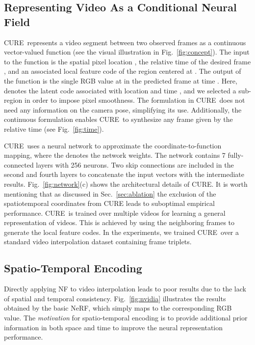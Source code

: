 \documentclass[12pt]{article}
\def\proposed{CURE}
\begin{document}
\subsection{Representing Video As a Conditional Neural Field}

\proposed~represents a video segment between two observed frames as a continuous vector-valued function (see the visual illustration in Fig.~\ref{fig:concept}). The input to the function is the spatial pixel location , the relative time of the desired frame , and an associated local feature code  of the  region centered at . The output of the function is the single RGB value  at  in the predicted frame at time . 
Here,  denotes the latent code associated with location  and time , and we selected a  sub-region in order to impose pixel smoothness.
The formulation in \proposed~does not need any information on the camera pose, simplifying its use.  Additionally, the continuous formulation enables \proposed~to synthesize any frame given by the relative time  (see Fig.~\ref{fig:time}).

\proposed~uses a neural network  to approximate the coordinate-to-function mapping, where the  denotes the network weights. The network contains 7 fully-connected layers with 256 neurons. Two skip connections are included in the second and fourth layers to concatenate the input vectors with the intermediate results. Fig.~\ref{fig:network}(c) shows the architectural details of CURE.
It is worth mentioning that as discussed in Sec.~\ref{sec:ablation} the exclusion of the spatiotemporal coordinates from CURE leads to suboptimal empirical performance.
\proposed~is trained over multiple videos for learning a general representation of videos. This is achieved by using the neighboring frames to generate the local feature codes. In the experiments, we trained \proposed~over a standard video interpolation dataset containing frame triplets. 

\subsection{Spatio-Temporal Encoding}
\label{sec:STEM}

Directly applying NF to video interpolation leads to poor results due to the lack of spatial and temporal consistency.
Fig.~\ref{fig:nvidia} illustrates the results obtained by the basic NeRF, which simply maps  to the corresponding RGB value. The \emph{motivation} for spatio-temporal encoding is to provide additional prior information in both space and time to improve the neural representation performance.
\end{document}
